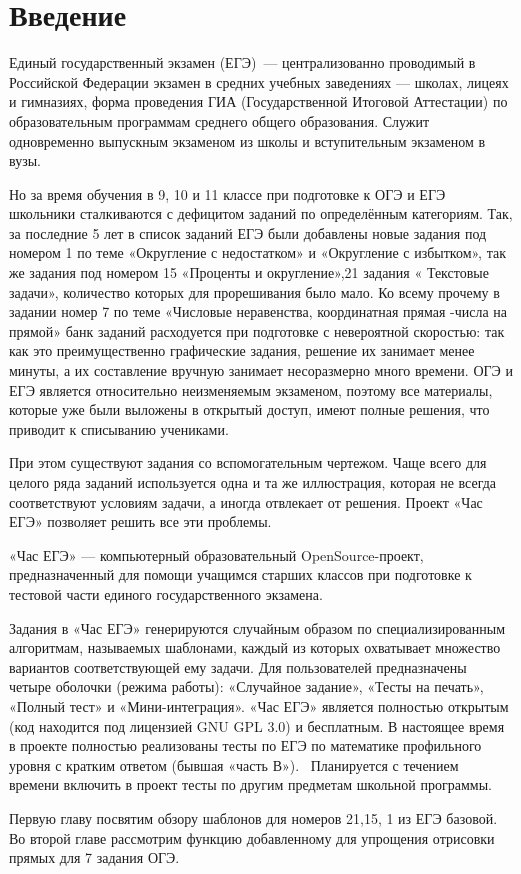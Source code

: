 
\section*{Введение}
Единый государственный экзамен (ЕГЭ)~— централизованно проводимый в Российской
Федерации экзамен в средних учебных заведениях — школах, лицеях и гимназиях,
форма проведения ГИА (Государственной Итоговой Аттестации) по образовательным программам среднего общего образования.
Служит одновременно выпускным экзаменом из школы и вступительным экзаменом в вузы.

Но за время обучения в 9, 10 и 11 классе при подготовке к ОГЭ и ЕГЭ школьники сталкиваются с дефицитом заданий по определённым категориям.
Так, за последние 5 лет в список заданий ЕГЭ были добавлены новые задания под номером 1 по теме «Округление с недостатком» и «Округление с избытком», так же задания под номером 15 «Проценты и округление»,21 задания « Текстовые задачи», количество которых для прорешивания было мало. 
Ко всему прочему в задании номер 7 по теме «Числовые неравенства, координатная прямая -числа на прямой» банк заданий расходуется при подготовке с невероятной скоростью:
так как это преимущественно графические задания, решение их занимает менее минуты, а их составление вручную занимает несоразмерно много времени. ОГЭ и ЕГЭ является относительно неизменяемым экзаменом, поэтому все материалы, которые уже были выложены в открытый доступ, имеют полные решения, что приводит к списыванию учениками.

При этом существуют задания со вспомогательным чертежом. Чаще всего для целого ряда заданий используется одна и та же иллюстрация, которая не всегда соответствуют условиям задачи, а иногда отвлекает от решения.
Проект «Час ЕГЭ» позволяет решить все эти проблемы.

«Час ЕГЭ» — компьютерный образовательный OpenSource-проект, предназначенный для помощи учащимся
старших классов при подготовке к тестовой части единого государственного экзамена.

Задания в «Час ЕГЭ» генерируются случайным образом по специализированным алгоритмам,
называемых шаблонами, каждый из которых
охватывает множество вариантов соответствующей ему задачи. Для
пользователей
предназначены четыре оболочки (режима работы): «Случайное задание», «Тесты на печать»,
«Полный тест» и «Мини-интеграция».
«Час ЕГЭ» является полностью открытым (код находится под лицензией GNU GPL 3.0)
и бесплатным.
В настоящее время в проекте полностью реализованы тесты по ЕГЭ по математике профильного уровня с кратким
ответом (бывшая «часть В»).~\cite{fipi}
Планируется с течением времени включить в проект тесты по другим предметам школьной
программы.

Первую главу посвятим обзору шаблонов для номеров 21,15, 1 из ЕГЭ базовой.
Во второй главе рассмотрим функцию добавленному для упрощения отрисовки прямых для 7 задания ОГЭ.
